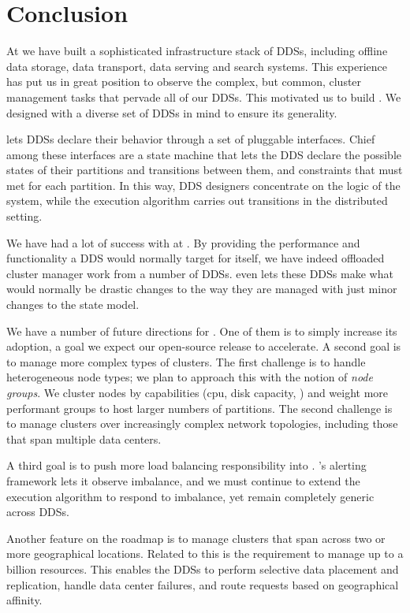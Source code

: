 \section{Conclusion}
\label{sec:conclusion}
%
At \linkedin we have built a sophisticated infrastructure stack of DDSs, including
offline data storage, data transport, data serving and search systems.  This
experience has put us in great position to observe the complex, but common,
cluster management tasks that pervade all of our DDSs.  This motivated us to
build \helix.  We designed \helix with a diverse set of DDSs in mind to ensure
its generality.

\helix lets DDSs declare their behavior through a set of pluggable interfaces.
Chief among these interfaces are a state machine that lets the DDS declare the
possible states of their partitions and transitions between them, and constraints 
that must met for each partition.  In this way, DDS designers concentrate on
the logic of the system, while the \helix execution algorithm carries out transitions in the distributed
setting.  

We have had a lot of success with \helix at \linkedin.  By providing the
performance and functionality a DDS would normally target for itself, we have indeed
offloaded cluster manager work from a number of DDSs.  \helix even lets these DDSs
make what would normally be drastic changes to the way they are managed with
just minor changes to the \helix state model.    

We have a number of future directions for \helix.  One of them is to simply
increase its adoption, a goal we expect our open-source release to accelerate.
A second goal is to manage more complex types of clusters.  The first challenge
is to handle heterogeneous node types; we plan to approach this with the notion
of \emph{node groups}.  We cluster nodes by capabilities (cpu, disk capacity,
\etc) and weight more performant groups to host larger numbers of partitions. 
The second challenge is to manage clusters over increasingly complex network
topologies, including those that span multiple data centers.  

A third goal is to push more load balancing responsibility into \helix.  \helix's
alerting framework lets it observe imbalance, and we must continue to extend the
\helix execution algorithm to respond to imbalance, yet remain completely
generic across DDSs. 

Another feature on the roadmap is to manage clusters that span across two or
more geographical locations. Related to this is the requirement to manage up to a billion resources.
This enables the DDSs to perform selective data placement and replication, handle data center failures, 
and route requests based on geographical affinity.

